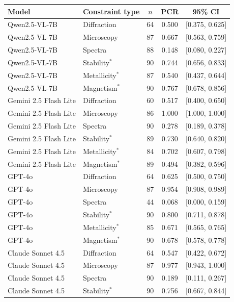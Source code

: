 \documentclass[11pt,a4paper]{article}
\begin{document}
\begin{table}[htbp]
\centering
{\scriptsize\setlength{\tabcolsep}{4pt}\renewcommand{\arraystretch}{1.05}
\begin{tabular}{l l S[table-format=3.0] S[table-format=1.3] c}
\toprule
Model & Constraint type & {$n$} & {PCR} & {95\% CI} \\
\midrule
Qwen2.5-VL-7B & Diffraction & 64 & 0.500 & [0.375, 0.625] \\
Qwen2.5-VL-7B & Microscopy & 87 & 0.667 & [0.563, 0.759] \\
Qwen2.5-VL-7B & Spectra & 88 & 0.148 & [0.080, 0.227] \\
Qwen2.5-VL-7B & Stability$^{*}$ & 90 & 0.744 & [0.656, 0.833] \\
Qwen2.5-VL-7B & Metallicity$^{*}$ & 87 & 0.540 & [0.437, 0.644] \\
Qwen2.5-VL-7B & Magnetism$^{*}$ & 90 & 0.767 & [0.678, 0.856] \\
\addlinespace
Gemini 2.5 Flash Lite & Diffraction & 60 & 0.517 & [0.400, 0.650] \\
Gemini 2.5 Flash Lite & Microscopy & 86 & 1.000 & [1.000, 1.000] \\
Gemini 2.5 Flash Lite & Spectra & 90 & 0.278 & [0.189, 0.378] \\
Gemini 2.5 Flash Lite & Stability$^{*}$ & 89 & 0.730 & [0.640, 0.820] \\
Gemini 2.5 Flash Lite & Metallicity$^{*}$ & 84 & 0.702 & [0.607, 0.798] \\
Gemini 2.5 Flash Lite & Magnetism$^{*}$ & 89 & 0.494 & [0.382, 0.596] \\
\addlinespace
GPT-4o & Diffraction & 64 & 0.625 & [0.500, 0.750] \\
GPT-4o & Microscopy & 87 & 0.954 & [0.908, 0.989] \\
GPT-4o & Spectra & 44 & 0.068 & [0.000, 0.159] \\
GPT-4o & Stability$^{*}$ & 90 & 0.800 & [0.711, 0.878] \\
GPT-4o & Metallicity$^{*}$ & 85 & 0.671 & [0.565, 0.765] \\
GPT-4o & Magnetism$^{*}$ & 90 & 0.678 & [0.578, 0.778] \\
\addlinespace
Claude Sonnet 4.5 & Diffraction & 64 & 0.547 & [0.422, 0.672] \\
Claude Sonnet 4.5 & Microscopy & 87 & 0.977 & [0.943, 1.000] \\
Claude Sonnet 4.5 & Spectra & 90 & 0.189 & [0.111, 0.267] \\
Claude Sonnet 4.5 & Stability$^{*}$ & 90 & 0.756 & [0.667, 0.844] \\

\end{tabular}}
\end{table}
\end{document}
